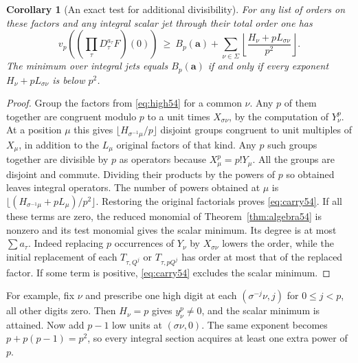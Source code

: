 \documentclass[a4paper,11pt]{article}
\newtheorem{corollary}[proposition]{Corollary}
\theoremstyle{definition}
\theoremstyle{remark}
\numberwithin{equation}{section}
\begin{document}
\begin{corollary}[An exact test for additional divisibility]\label{cor:carry54}
For any list of orders on these factors and any integral scalar
jet through their total order one has
\begin{equation}
 v_p\!\left(\left(\prod_\tau D_\tau^{a_\tau}F\right)(0)\right)
 \ \ge\ B_p(\boldsymbol a)+
       \sum_{\nu\in\Sigma}\left\lfloor
             \frac{H_\nu+pL_{\sigma\nu}}{p^2}\right\rfloor .
                                                             \label{eq:carry54}
\end{equation}
The minimum over integral jets equals \(B_p(\boldsymbol a)\) if
and only if every exponent \(H_\nu+pL_{\sigma\nu}\) is below \(p^2\).
\end{corollary}
\begin{proof}
Group the factors from \eqref{eq:high54} for a common \(\nu\).
Any \(p\) of them together are congruent modulo \(p\) to a unit
times \(X_{\sigma\nu}\), by the computation of \(Y_\nu^p\).
At a position \(\mu\) this gives
\(\lfloor H_{\sigma^{-1}\mu}/p\rfloor\) disjoint groups congruent
to unit multiples of \(X_\mu\), in addition to the \(L_\mu\)
original factors of that kind. Any \(p\) such groups together
are divisible by \(p\) as operators because \(X_\mu^p=p!Y_\mu\).
All the groups are disjoint and commute. Dividing their products by
the powers of \(p\) so obtained leaves integral operators. The number
of powers obtained at \(\mu\) is
\(\lfloor(H_{\sigma^{-1}\mu}+pL_\mu)/p^2\rfloor\).
Restoring the original factorials proves \eqref{eq:carry54}.
If all these terms are zero, the reduced monomial of
Theorem~\ref{thm:algebra54} is nonzero and its test monomial gives
the scalar minimum. Its degree is at most \(\sum a_\tau\).
Indeed replacing \(p\) occurrences of \(Y_\nu\) by
\(X_{\sigma\nu}\) lowers the order, while the initial replacement
of each \(T_{\tau,Q^j}\) or \(T_{\tau,pQ^j}\) has order at most
that of the replaced factor. If some term is positive,
\eqref{eq:carry54} excludes the scalar minimum.
\end{proof}

For example, fix \(\nu\) and prescribe one high digit at each
\((\sigma^{-j}\nu,j)\) for \(0\le j<p\), all other digits zero.
Then \(H_\nu=p\) gives \(y_\nu^p\ne0\), and the scalar minimum
is attained. Now add \(p-1\) low units at \((\sigma\nu,0)\).
The same exponent becomes \(p+p(p-1)=p^2\), so every integral
section acquires at least one extra power of \(p\).
\end{document}
